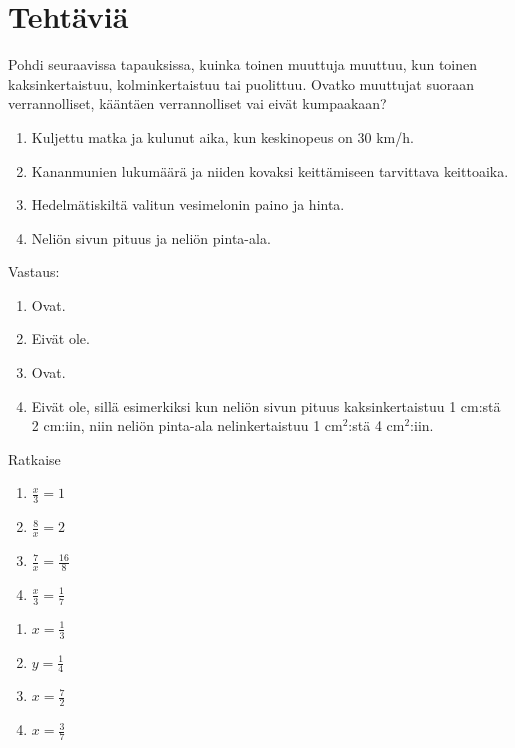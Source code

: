 \section*{Tehtäviä}

\begin{tehtava}
    Pohdi seuraavissa tapauksissa, kuinka toinen muuttuja muuttuu, kun toinen
    kaksinkertaistuu, kolminkertaistuu tai puolittuu. Ovatko muuttujat
    suoraan verrannolliset, kääntäen verrannolliset vai eivät kumpaakaan?
    
    \begin{enumerate}
        \item Kuljettu matka ja kulunut aika, kun keskinopeus on 30 km/h.
        \item Kananmunien lukumäärä ja niiden kovaksi keittämiseen tarvittava keittoaika.
        \item Hedelmätiskiltä valitun vesimelonin paino ja hinta.
        \item Neliön sivun pituus ja neliön pinta-ala.
    \end{enumerate}
    
    \begin{vastaus}
        Vastaus:
        \begin{enumerate}
            \item Ovat.
            \item Eivät ole.
            \item Ovat.
            \item Eivät ole, sillä esimerkiksi kun neliön sivun pituus
                kaksinkertaistuu 1 cm:stä 2 cm:iin, niin neliön pinta-ala
                nelinkertaistuu 1 cm$^2$:stä 4 cm$^2$:iin.
        \end{enumerate}
    \end{vastaus}
\end{tehtava}

\begin{tehtava}
Ratkaise
\begin{enumerate}
\item $ \frac{x}{3} = 1$
\item $ \frac{8}{x} = 2$
\item $ \frac{7}{x} = \frac{16}{8}$
\item $ \frac{x}{3} = \frac{1}{7}$
\end{enumerate}
\begin{vastaus}
\begin{enumerate}
\item $x= \frac{1}{3}$
\item $y= \frac{1}{4}$
\item $x= \frac{7}{2}$
\item $x= \frac{3}{7}$
\end{enumerate}
\end{vastaus}
\end{tehtava}

